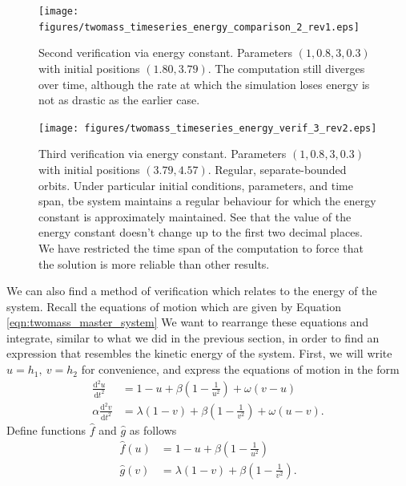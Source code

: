 \documentclass{report}
\begin{document}
\begin{figure}
    \centering
    \texttt{[image: figures/twomass\_timeseries\_energy\_comparison\_2\_rev1.eps]}
    \caption{
        Second verification via energy constant.
        Parameters \((1, 0.8, 3, 0.3)\) with initial positions \((1.80, 3.79)\).
        The computation still diverges over time,
        although the rate at which the simulation loses energy is not as drastic as the earlier case.
    }
    \label{fig:twomass_energy_2}  %
\end{figure}

\begin{figure}
    \centering
    \texttt{[image: figures/twomass\_timeseries\_energy\_verif\_3\_rev2.eps]}
    \caption{
        Third verification via energy constant.
        Parameters \((1, 0.8, 3, 0.3)\) with initial positions \((3.79, 4.57)\).
        Regular, separate-bounded orbits.
        Under particular initial conditions, parameters, and time span,
        tbe system maintains a regular behaviour for which the energy constant is approximately maintained.
        See that the value of the energy constant doesn't change up to the first two decimal places.
        We have restricted the time span of the computation to force that the solution is more reliable than other results.
    }
    \label{fig:twomass_energy_3}
\end{figure}
We can also find a method of verification which relates to the energy of the system.
Recall the equations of motion which are given by Equation \ref{eqn:twomass_master_system}
We want to rearrange these equations and integrate, similar to what we did in the previous section, in order to find an expression that resembles the kinetic energy of the system.
First, we will write \(u = h_1,~v=h_2\) for convenience, and express the equations of motion in the form
\begin{align*}
    \frac{\mathrm{d}^2 u}{\mathrm{d}t^2} &= 1 - u + \beta\left(1-\frac{1}{u^2}\right) + \omega(v-u) \\
    \alpha\frac{\mathrm{d}^2 v}{\mathrm{d}t^2} &= \lambda(1 - v) + \beta\left(1-\frac{1}{v^2}\right) + \omega(u-v).
\end{align*}
Define functions $\hat{f}$ and $\hat{g}$ as follows
\begin{align*}
    \hat{f}(u) &= 1-u + \beta\left(1-\frac{1}{u^2}\right) \\
    \hat{g}(v) &= \lambda(1-v) + \beta\left( 1-\frac{1}{v^2} \right).
\end{align*}
\end{document}
